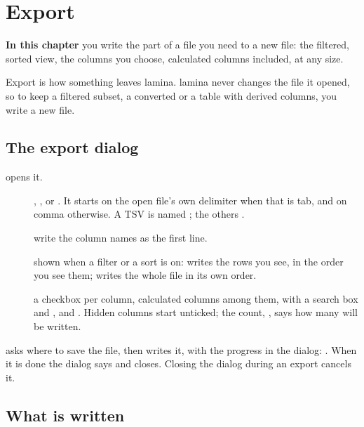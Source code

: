 \chapter{Export}\label{ch:export}
\begin{goals}
\textbf{In this chapter} you write the part of a file you need to a new file: the filtered, sorted view,
the columns you choose, calculated columns included, at any size.
\end{goals}

Export is how something leaves lamina. lamina never changes the file it opened, so to keep a filtered
subset, a converted  or a table with derived columns, you write a new file.

\section{The export dialog}\label{sec:export-dialog}

 opens it.


\begin{description}
\item[] , ,  or . It starts on the open
file's own delimiter when that is tab, and on comma otherwise. A TSV is named ; the others
.
\item[] write the column names as the first line.
\item[] shown when a filter or a sort is on:  writes the
rows you see, in the order you see them;  writes the whole file in its own order.
\item[] a checkbox per column, calculated columns among them, with a search box and
,  and . Hidden columns start unticked; the count, , says how
many will be written.
\end{description}

 asks where to save the file, then writes it, with the progress in the dialog:
. When it is done the dialog says  and closes. Closing the dialog during an export cancels it.

\section{What is written}\label{sec:export-what}

